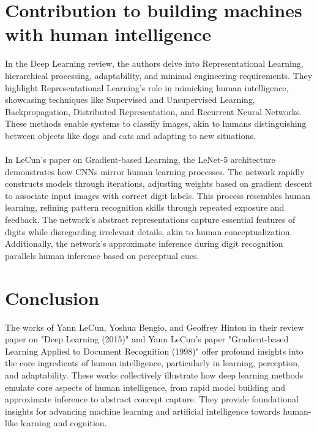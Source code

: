 \documentclass[a4paper,11pt]{article}
\begin{document}
\section{Contribution to building machines with human intelligence}
In the Deep Learning review, the authors delve into Representational Learning, hierarchical processing, adaptability, and minimal engineering requirements. They highlight Representational Learning's role in mimicking human intelligence, showcasing techniques like Supervised and Unsupervised Learning, Backpropagation, Distributed Representation, and Recurrent Neural Networks. These methods enable systems to classify images, akin to humans distinguishing between objects like dogs and cats and adapting to new situations. \cite{lecun2015} \\\\
In LeCun's paper on Gradient-based Learning, the LeNet-5 architecture demonstrates how CNNs mirror human learning processes. The network rapidly constructs models through iterations, adjusting weights based on gradient descent to associate input images with correct digit labels. This process resembles human learning, refining pattern recognition skills through repeated exposure and feedback. The network's abstract representations capture essential features of digits while disregarding irrelevant details, akin to human conceptualization. Additionally, the network's approximate inference during digit recognition parallels human inference based on perceptual cues. \cite{lecun1998}
\section{Conclusion}
\label{sec:conclusion}
The works of Yann LeCun, Yoshua Bengio, and Geoffrey Hinton in their review paper on "Deep Learning (2015)" and Yann LeCun's paper "Gradient-based Learning Applied to Document Recognition (1998)" offer profound insights into the core ingredients of human intelligence, particularly in learning, perception, and adaptability. These works collectively illustrate how deep learning methods emulate core aspects of human intelligence, from rapid model building and approximate inference to abstract concept capture. They provide foundational insights for advancing machine learning and artificial intelligence towards human-like learning and cognition.
\newpage
\nocite{*}

\end{document}
